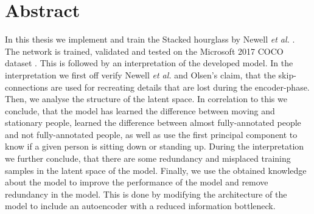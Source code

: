\documentclass[./main.tex]{subfiles}
\begin{document}
\section*{Abstract}
In this thesis we implement and train the Stacked hourglass by Newell \textit{et al.} \cite{Newell}. The network is trained, validated and tested on the Microsoft 2017 COCO dataset \cite{COCO_article}. This is followed by an interpretation of the developed model. In the interpretation we first off verify Newell \textit{et al.} \cite{Newell} and Olsen's \cite{Camilla} claim, that the skip-connections are used for recreating details that are lost during the encoder-phase. Then, we analyse the structure of the latent space. In correlation to this we conclude, that the model has learned the difference between moving and stationary people, learned the difference between almost fully-annotated people and not fully-annotated people, as well as use the first principal component to know if a given person is sitting down or standing up. During the interpretation we further conclude, that there are some redundancy and misplaced training samples in the latent space of the model. Finally, we use the obtained knowledge about the model to improve the performance of the model and remove redundancy in the model. This is done by modifying the architecture of the model to include an autoencoder with a reduced information bottleneck. 
\end{document}
